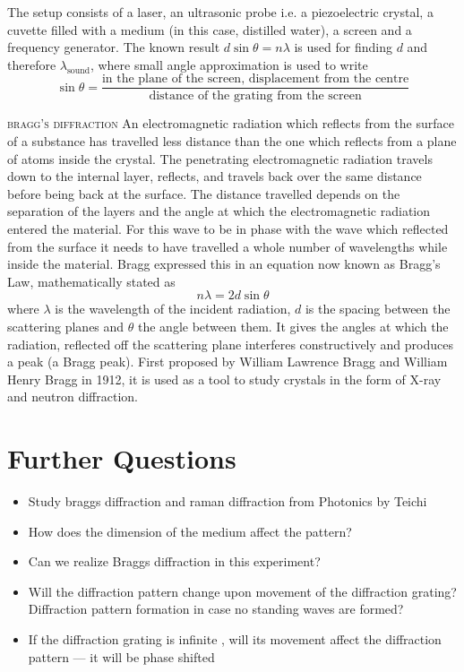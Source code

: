 	The setup consists of a laser, an ultrasonic probe i.e. a piezoelectric crystal, a cuvette filled with a medium (in this case, distilled water), a screen and a frequency generator. The known result $d \sin \theta = n \lambda$ is used for finding $d$ and therefore $\lambda_\text{sound}$, where small angle approximation is used to write 
	\begin{equation*}
		\sin \theta = \frac {\text{in the plane of the screen, displacement from the centre}}{\text{distance of the grating from the screen}}
	\end{equation*}

	\textsc{bragg's diffraction}
	An electromagnetic radiation which reflects from the surface of a substance has travelled less distance than the one which reflects from a plane of atoms inside the crystal. The penetrating electromagnetic radiation travels down to the internal layer, reflects, and travels back over the same distance before being back at the surface. The distance travelled depends on the separation of the layers and the angle at which the electromagnetic radiation entered the material. For this wave to be in phase with the wave which reflected from the surface it needs to have travelled a whole number of wavelengths while inside the material. Bragg expressed this in an equation now known as Bragg's Law, mathematically stated as 
	\begin{equation*}
	n \lambda = 2d \sin \theta
	\end{equation*}
	where $\lambda$ is the wavelength of the incident radiation, $d$ is the spacing between the scattering planes and $\theta$ the angle between them.
	It gives the angles at which the radiation, reflected off the scattering plane interferes constructively and produces a peak (a Bragg peak).
	First proposed by William Lawrence Bragg and William Henry Bragg in 1912, it is used as a tool to study crystals in the form of X-ray and neutron diffraction. 





\section{Further Questions}
	\begin{itemize}
		\item Study braggs diffraction and raman diffraction from Photonics by Teichi 
		\item How does the dimension of the medium affect the pattern?
		\item Can we realize Braggs diffraction in this experiment?
		\item Will the diffraction pattern change upon movement of the diffraction grating? Diffraction pattern formation in case no standing waves are formed?
		\item If the diffraction grating is infinite , will its movement affect the diffraction pattern --- it will be phase shifted
	\end{itemize}

